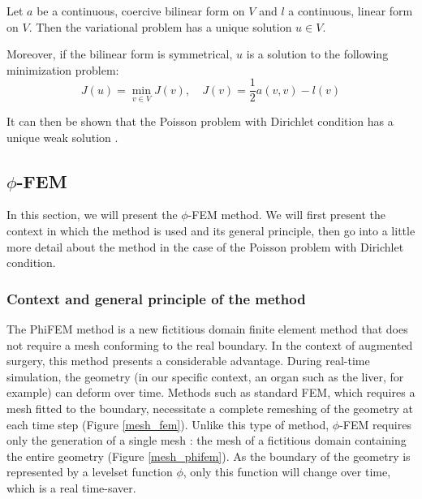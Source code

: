 
\begin{Prop}
	
	Let $a$ be a continuous, coercive bilinear form on $V$ and $l$ a continuous, linear form on $V$. Then the variational problem has a unique solution $u\in V$. 
	
	Moreover, if the bilinear form is symmetrical, $u$ is a solution to the following minimization problem:
	\begin{equation*}
		J(u)=\min_{v\in V} J(v), \quad J(v)=\frac{1}{2}a(v,v)-l(v)
	\end{equation*}
\end{Prop}

It can then be shown that the Poisson problem with Dirichlet condition has a unique weak solution .





\newpage

\subsection{$\phi$-FEM}

In this section, we will present the $\phi$-FEM method. We will first present the context in which the method is used and its general principle, then go into a little more detail about the method in the case of the Poisson problem with Dirichlet condition. 

\subsubsection{Context and general principle of the method}

The PhiFEM method is a new fictitious domain finite element method that does not require a mesh conforming to the real boundary. In the context of augmented surgery, this method presents a considerable advantage. During real-time simulation, the geometry (in our specific context, an organ such as the liver, for example) can deform over time. Methods such as standard FEM, which requires a mesh fitted to the boundary, necessitate a complete remeshing of the geometry at each time step (Figure \ref{mesh_fem}). Unlike this type of method, $\phi$-FEM requires only the generation of a single mesh : the mesh of a fictitious domain containing the entire geometry (Figure \ref{mesh_phifem}). As the boundary of the geometry is represented by a levelset function $\phi$, only this function will change over time, which is a real time-saver.

